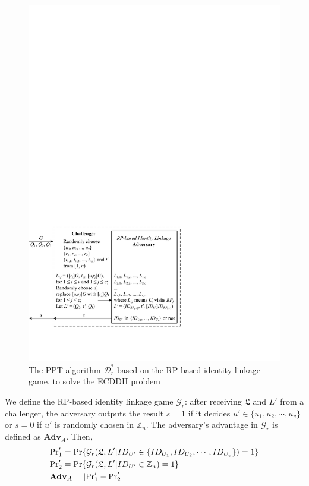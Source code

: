 {{\begin{figure}[tb]
  \centering
  \includegraphics[width=0.97\linewidth]{fig/dalgorithm.pdf}
  \caption{The PPT algorithm $\mathcal{D}^*_r$ based on the RP-based identity linkage game, to solve the ECDDH problem}
  \label{fig:dalgorithm}
\end{figure}

We define the RP-based identity linkage game $\mathcal{G}_r$:
after receiving $\mathfrak{L}$ and $L'$ from a challenger,
    the adversary outputs the result $s = 1$ if it decides $u' \in \{u_1, u_2, \cdots, u_v\}$ or $s = 0$ if $u'$ is randomly chosen in $\mathbb{Z}_n$.
The adversary's advantage in $\mathcal{G}_r$ is defined as $\mathbf{Adv}_{A}$.
Then,
\begin{align*}
&{\rm Pr}'_1={\rm Pr}\{\mathcal{G}_r(\mathfrak{L}, L'|ID_{U'} \in \{ID_{U_1}, ID_{U_2}, \cdots, ID_{U_v}\})=1\} \\
&{\rm Pr}'_2={\rm Pr}\{\mathcal{G}_r(\mathfrak{L}, L'|ID_{U'} \in \mathbb{Z}_n)=1\}\\
&{\mathbf{Adv}}_{A}=|{\rm Pr}'_1-{\rm Pr}'_2|
\end{align*}

}}
